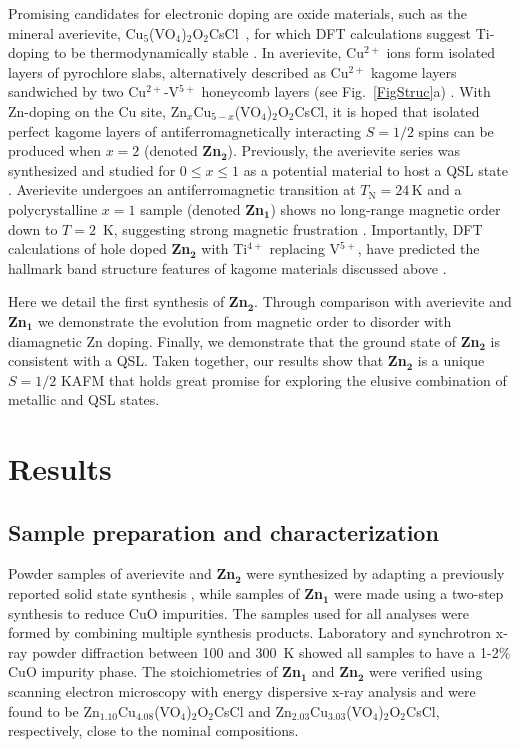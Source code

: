 \documentclass[
sn-nature,
Numbered,
iicol]
{sn-jnl}%
\newcommand{\ave}{Cu$_5$(VO$_4$)$_{2}$O$_2$CsCl}
\newcommand{\aveser}{Zn$_x$Cu$_{5-x}$(VO$_4$)$_{2}$O$_2$CsCl}
\begin{document}
Promising candidates for electronic doping are oxide materials, such as the mineral averievite, \ave\ , for which DFT calculations suggest Ti-doping to be thermodynamically stable \cite{Botana2018,Dey2020}.
In averievite, Cu$^{2+}$ ions form isolated layers of pyrochlore slabs, alternatively described as Cu$^{2+}$ kagome layers sandwiched by two Cu$^{2+}$-V$^{5+}$ honeycomb layers (see Fig.~\ref{FigStruc}a) \cite{Botana2018}. 
With Zn-doping on the Cu site, \aveser, it is hoped that isolated perfect kagome layers of antiferromagnetically interacting $S=1/2$ spins can be produced when $x = 2$ (denoted {\bf Zn$\mathbf {_2}$}).
Previously, the averievite series was synthesized and studied for $0\leq x \leq 1$  as a potential material to host a QSL state \cite{Botana2018}. 
Averievite undergoes an antiferromagnetic transition at $T_\textrm{N}=24$\,K and a polycrystalline $x=1$ sample (denoted {\bf Zn$\mathbf {_1}$}) shows no long-range magnetic order down to $T=2$~K, suggesting strong magnetic frustration \cite{Botana2018}. 
Importantly, DFT calculations of hole doped {\bf Zn$\mathbf {_2}$} with Ti$^{4+}$ replacing V$^{5+}$, have predicted the hallmark band structure features of kagome materials discussed above \cite{Botana2018,Dey2020}.

Here we detail the first synthesis of {\bf Zn$\mathbf {_2}$}. Through comparison with averievite and {\bf Zn$\mathbf {_1}$} we demonstrate the evolution from magnetic order to disorder with diamagnetic Zn doping. Finally, we demonstrate that the ground state of {\bf Zn$\mathbf {_2}$} is consistent with a QSL. Taken together, our results show that {\bf Zn$\mathbf {_2}$} is a unique $S = 1/2$ KAFM that holds great promise for exploring the elusive combination of metallic and QSL states.



 \section{Results}
 
 \subsection{Sample preparation and characterization}
Powder samples of averievite and {\bf Zn$\mathbf {_2}$} were synthesized by adapting a previously reported solid state synthesis \cite{Botana2018}, 
while samples of {\bf Zn$\mathbf {_1}$} were made using a two-step synthesis to reduce CuO impurities.  
The samples used for all analyses were formed by combining multiple synthesis products. 
Laboratory and synchrotron x-ray powder diffraction between 100 and 300~K showed all samples to have a 1-2\% CuO impurity phase.
The stoichiometries of {\bf Zn$\mathbf {_1}$} and {\bf Zn$\mathbf {_2}$} were verified using scanning electron microscopy with energy dispersive x-ray analysis 
and were found to be Zn$_{1.10}$Cu$_{4.08}$(VO$_4$)$_2$O$_2$CsCl and Zn$_{2.03}$Cu$_{3.03}$(VO$_4$)$_2$O$_2$CsCl, respectively,
close to the nominal compositions. 
\end{document}
